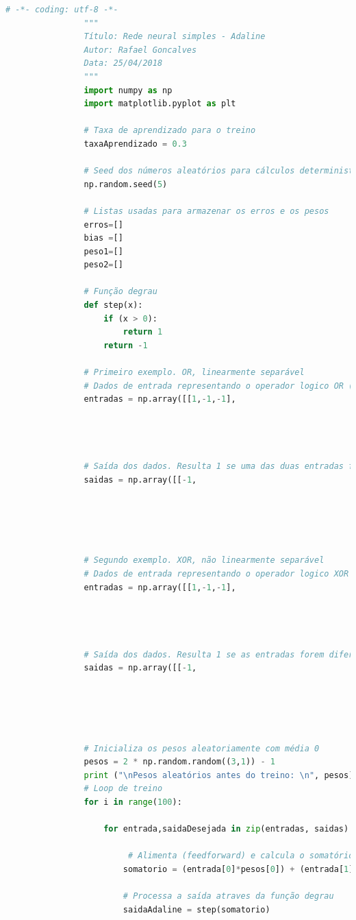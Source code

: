 \documentclass[a4paper,11pt]{article}
\begin{document}
			\begin{lstlisting}[language=Python]
				# -*- coding: utf-8 -*-
				"""
				Título: Rede neural simples - Adaline
				Autor: Rafael Goncalves
				Data: 25/04/2018
				"""
				import numpy as np
				import matplotlib.pyplot as plt

				# Taxa de aprendizado para o treino
				taxaAprendizado = 0.3

				# Seed dos números aleatórios para cálculos deterministicos
				np.random.seed(5)

				# Listas usadas para armazenar os erros e os pesos
				erros=[]
				bias =[]
				peso1=[]
				peso2=[]

				# Função degrau
				def step(x):
					if (x > 0):
						return 1
					return -1

				# Primeiro exemplo. OR, linearmente separável
				# Dados de entrada representando o operador logico OR (com o BIAS fixo de 1)
				entradas = np.array([[1,-1,-1],
									 															[1, 1,-1],
									 															[1,-1, 1],
										 														[1, 1, 1]])
					
				# Saída dos dados. Resulta 1 se uma das duas entradas for 1          
				saidas = np.array([[-1,
																								 1,
																								 1,
																								 1]]).T


				# Segundo exemplo. XOR, não linearmente separável
				# Dados de entrada representando o operador logico XOR (com o BIAS fixo de 1)
				entradas = np.array([[1,-1,-1],
									 															[1, 1,-1],
									  														[1,-1, 1],
									  														[1, 1, 1]])

				# Saída dos dados. Resulta 1 se as entradas forem diferentes.          
				saidas = np.array([[-1,
																								 1,
									 														 1,
																							 -1]]).T


				# Inicializa os pesos aleatoriamente com média 0
				pesos = 2 * np.random.random((3,1)) - 1
				print ("\nPesos aleatórios antes do treino: \n", pesos)
				# Loop de treino
				for i in range(100):

					for entrada,saidaDesejada in zip(entradas, saidas):
						
						 # Alimenta (feedforward) e calcula o somatório da Adaline
						somatorio = (entrada[0]*pesos[0]) + (entrada[1]*pesos[1]) + (entrada[2]*pesos[2])

						# Processa a saída atraves da função degrau
						saidaAdaline = step(somatorio)


\end{lstlisting}
\end{document}
